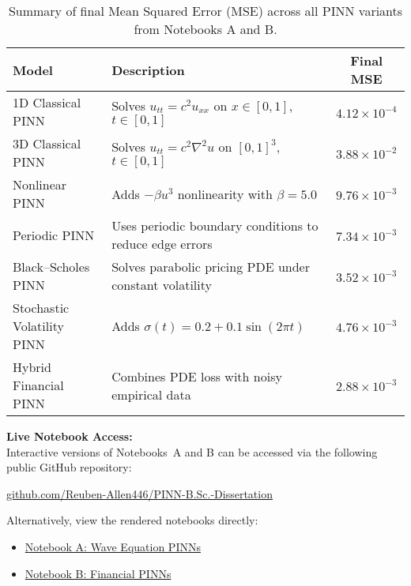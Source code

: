 \documentclass[12pt,a4paper]{article}
\begin{document}
\begin{table}[h!]
\centering
\caption{Summary of final Mean Squared Error (MSE) across all PINN variants from Notebooks A and B.}
\label{tab:results-summary}
\renewcommand{\arraystretch}{1.3}
\begin{tabularx}{\textwidth}{|l|X|c|}
\hline
\textbf{Model} & \textbf{Description} & \textbf{Final MSE} \\
\hline
1D Classical PINN & Solves $u_{tt} = c^2 u_{xx}$ on $x \in [0,1]$, $t \in [0,1]$ & $4.12 \times 10^{-4}$ \\
\hline
3D Classical PINN & Solves $u_{tt} = c^2 \nabla^2 u$ on $[0,1]^3$, $t \in [0,1]$ & $3.88 \times 10^{-2}$ \\
\hline
Nonlinear PINN & Adds $-\beta u^3$ nonlinearity with $\beta = 5.0$ & $9.76 \times 10^{-3}$ \\
\hline
Periodic PINN & Uses periodic boundary conditions to reduce edge errors & $7.34 \times 10^{-3}$ \\
\hline
Black--Scholes PINN & Solves parabolic pricing PDE under constant volatility & $3.52 \times 10^{-3}$ \\
\hline
Stochastic Volatility PINN & Adds $\sigma(t) = 0.2 + 0.1\sin(2\pi t)$ & $4.76 \times 10^{-3}$ \\
\hline
Hybrid Financial PINN & Combines PDE loss with noisy empirical data & $2.88 \times 10^{-3}$ \\
\hline
\end{tabularx}
\end{table}

\vspace{1em}
\noindent \textbf{Live Notebook Access:} \\
Interactive versions of Notebooks~A and B can be accessed via the following public GitHub repository:

\href{https://github.com/Reuben-Allen446/PINN-B.Sc.-Dissertation}{github.com/Reuben-Allen446/PINN-B.Sc.-Dissertation}

\noindent Alternatively, view the rendered notebooks directly:
\begin{itemize}
  \item \href{https://nbviewer.org/github/Reuben-Allen446/PINN-B.Sc.-Dissertation/blob/main/Notebook_A_Wave_PINNs.ipynb}{Notebook A: Wave Equation PINNs}
  \item \href{https://nbviewer.org/github/Reuben-Allen446/PINN-B.Sc.-Dissertation/blob/main/Notebook_B_Financial_PINNs.ipynb}{Notebook B: Financial PINNs}
\end{itemize}

\newpage
{}


\end{document}
